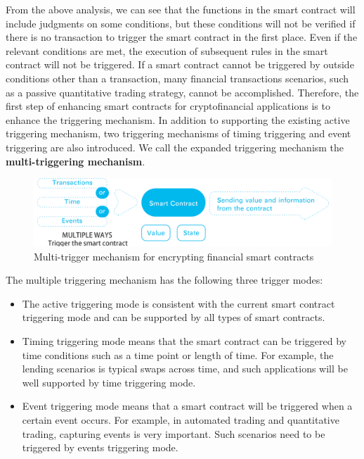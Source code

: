 \documentclass[a4paper,12pt]{article}
\begin{document}
From the above analysis, we can see that the functions in the smart contract will include judgments on some conditions, but these conditions will not be verified if there is no transaction to trigger the smart contract in the first place. Even if the relevant conditions are met, the execution of subsequent rules in the smart contract will not be triggered. If a smart contract cannot be triggered by outside conditions other than a transaction, many financial transactions scenarios, such as a passive quantitative trading strategy, cannot be accomplished. Therefore, the first step of enhancing smart contracts for cryptofinancial applications is to enhance the triggering mechanism. In addition to supporting the existing active triggering mechanism, two triggering mechanisms of timing triggering and event triggering are also introduced. We call the expanded triggering mechanism the \textbf{multi-triggering mechanism}.

\begin{figure} [htbp]
\centering \includegraphics [width = 5in]{pic/multipletrigger.png}
\caption{Multi-trigger mechanism for encrypting financial smart contracts} \label{fig: 1}
\end{figure}

The multiple triggering mechanism has the following three trigger modes:

\begin{itemize} [itemindent = 1em]
\item The active triggering mode is consistent with the current smart contract triggering mode and can be supported by all types of smart contracts.
\item Timing triggering mode means that the smart contract can be triggered by time conditions such as a time point or length of time. For example, the lending scenarios is typical swaps across time, and such applications will be well supported by time triggering mode.
\item Event triggering mode means that a smart contract will be triggered when a certain event occurs. For example, in automated trading and quantitative trading, capturing events is very important. Such scenarios need to be triggered by events triggering mode.
\end{itemize}
\end{document}
